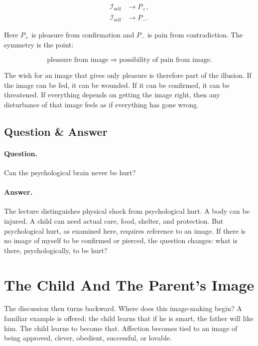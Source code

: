 \documentclass[11pt,oneside]{book}
\begin{document}
\begin{align}
\mathcal{I}_{\text{self}} &\longrightarrow P_{+},\\
\mathcal{I}_{\text{self}} &\longrightarrow P_{-}.
\end{align}

Here \(P_{+}\) is pleasure from confirmation and \(P_{-}\) is pain from contradiction. The symmetry is the point:

\begin{equation}
\text{pleasure from image}
\Longrightarrow
\text{possibility of pain from image}.
\end{equation}

The wish for an image that gives only pleasure is therefore part of the illusion. If the image can be fed, it can be wounded. If it can be confirmed, it can be threatened. If everything depends on getting the image right, then any disturbance of that image feels as if everything has gone wrong.

\subsection{Question \& Answer}

\paragraph{Question.}
Can the psychological brain never be hurt?

\paragraph{Answer.}
The lecture distinguishes physical shock from psychological hurt. A body can be injured. A child can need actual care, food, shelter, and protection. But psychological hurt, as examined here, requires reference to an image. If there is no image of myself to be confirmed or pierced, the question changes: what is there, psychologically, to be hurt?

\section{The Child And The Parent's Image}

The discussion then turns backward. Where does this image-making begin? A familiar example is offered: the child learns that if he is smart, the father will like him. The child learns to become that. Affection becomes tied to an image of being approved, clever, obedient, successful, or lovable.
\end{document}
